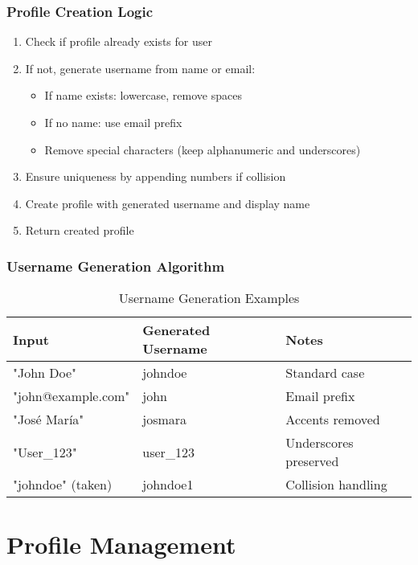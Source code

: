 \documentclass[12pt,a4paper]{report}
\begin{document}
\subsection{Profile Creation Logic}

\begin{enumerate}
    \item Check if profile already exists for user
    \item If not, generate username from name or email:
    \begin{itemize}
        \item If name exists: lowercase, remove spaces
        \item If no name: use email prefix
        \item Remove special characters (keep alphanumeric and underscores)
    \end{itemize}
    \item Ensure uniqueness by appending numbers if collision
    \item Create profile with generated username and display name
    \item Return created profile
\end{enumerate}

\subsection{Username Generation Algorithm}

\begin{table}[H]
\centering
\caption{Username Generation Examples}
\begin{tabular}{@{}lll@{}}
\toprule
\textbf{Input} & \textbf{Generated Username} & \textbf{Notes} \\ \midrule
"John Doe" & johndoe & Standard case \\
"john@example.com" & john & Email prefix \\
"José María" & josmara & Accents removed \\
"User\_123" & user\_123 & Underscores preserved \\
"johndoe" (taken) & johndoe1 & Collision handling \\ \bottomrule
\end{tabular}
\end{table}

\chapter{Profile Management}
\end{document}
